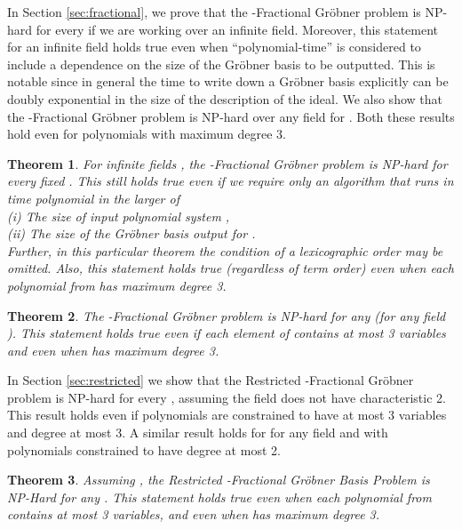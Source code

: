 \documentclass{article}
\newtheorem{thm}{Theorem}
\begin{document}
In Section \ref{sec:fractional}, we prove that the \nobreakdash-Fractional Gr\"obner problem is NP-hard for every  if we are working over an infinite field.  Moreover, this statement for an infinite field holds true even when ``polynomial-time'' is considered to include a dependence on the size of the Gr\"obner basis to be outputted. This is notable since in general the time to write down a Gr\"obner basis explicitly can be doubly exponential in the size of the description of the ideal.  We also show that the \nobreakdash-Fractional Gr\"{o}bner problem is NP-hard over any field for .  Both these results hold even for polynomials with maximum degree 3.



\begin{thm}\label{thm:main1}
For infinite fields , the \nobreakdash-Fractional Gr\"obner problem is NP-hard for every fixed . This still holds true even if we require only an algorithm that runs in time polynomial in the larger of\\
\hspace*{4mm}(i) The size of input polynomial system ,\\
\hspace*{4mm}(ii) The size of the Gr\"{o}bner basis output for . \\ 
Further, in this particular theorem the condition of a lexicographic order may be omitted. Also, this statement holds true (regardless of term order) even when each polynomial from   has maximum degree 3.  \end{thm}

\begin{thm}\label{thm:main2}
The \nobreakdash-Fractional Gr\"obner problem is NP-hard for any  (for any field ). This statement holds true even if each element of  contains at most 3 variables and even when  has maximum degree 3.
\end{thm}



In Section \ref{sec:restricted} we show that the Restricted \nobreakdash-Fractional Gr\"obner problem is NP-hard for every , assuming the field does not have characteristic 2. This result holds even if polynomials are constrained to have at most 3 variables and degree at most 3. A similar result holds for  for any field and with polynomials constrained to have degree at most 2.



\begin{thm}
\label{extfrachard}
Assuming , the Restricted \nobreakdash-Fractional Gr\"{o}bner Basis Problem is NP-Hard for any . This statement holds true even when each polynomial from  contains at most 3 variables, and even when  has maximum degree 3.
\end{thm}
\end{document}

